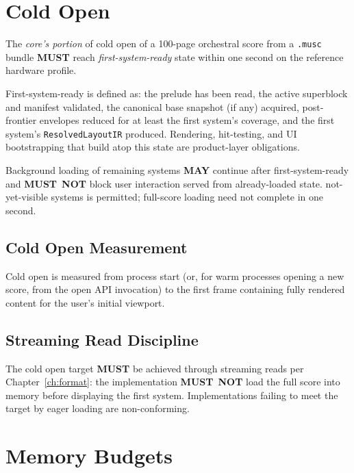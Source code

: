 \documentclass[11pt,letterpaper]{report}
\newcounter{requirement}[chapter]
\newcommand{\MUST}{\textbf{MUST}}
\newcommand{\MUSTNOT}{\textbf{MUST}\nobreak\ \textbf{NOT}}
\newcommand{\MAY}{\textbf{MAY}}
\begin{document}
\section{Cold Open}
\label{sec:perf:open}

\begin{requirement}
  \label{req:perf:cold-open-latency}
  The \emph{core's portion} of cold open of a 100-page orchestral
  score from a \texttt{.musc} bundle \MUST{} reach
  \emph{first-system-ready} state within one second on the
  reference hardware profile.

  First-system-ready is defined as: the prelude has been read,
  the active superblock and manifest validated, the canonical
  base snapshot (if any) acquired, post-frontier envelopes
  reduced for at least the first system's coverage, and the
  first system's \texttt{ResolvedLayoutIR} produced. Rendering,
  hit-testing, and UI bootstrapping that build atop this state
  are product-layer obligations.

  Background loading of remaining systems \MAY{} continue after
  first-system-ready and \MUSTNOT{} block user interaction
  served from already-loaded state.
  not-yet-visible systems is permitted; full-score loading need not
  complete in one second.
\end{requirement}

\subsection{Cold Open Measurement}

Cold open is measured from process start (or, for warm processes
opening a new score, from the open API invocation) to the first
frame containing fully rendered content for the user's initial
viewport.

\subsection{Streaming Read Discipline}

\begin{requirement}
  \label{req:perf:streaming-cold-open}
  The cold open target \MUST{} be achieved through streaming reads
  per Chapter~\ref{ch:format}: the implementation \MUSTNOT{} load
  the full score into memory before displaying the first system.
  Implementations failing to meet the target by eager loading are
  non-conforming.
\end{requirement}

\section{Memory Budgets}
\label{sec:perf:memory}
\end{document}
